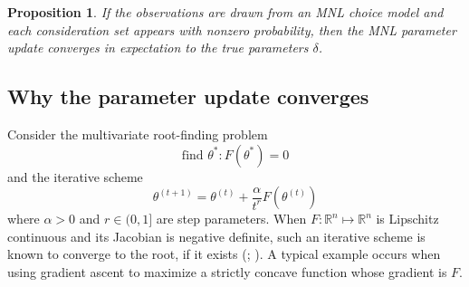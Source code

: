 \documentclass[preprint,12pt,authoryear]{elsarticle}
\newtheorem{proposition}{Proposition}
\begin{document}
\begin{proposition}If the observations are drawn from an MNL choice model and each consideration set appears with nonzero probability, then the MNL parameter update converges in expectation to the true parameters $\delta$.
\end{proposition}


\subsection{Why the parameter update converges}
Consider the multivariate root-finding problem \[\text{find } \theta^*: F(\theta^*) = 0\]
and the iterative scheme \[\theta^{(t+1)} = \theta^{(t)} + \frac{\alpha}{t^r} F\left(\theta^{(t)} \right)\]
where $\alpha >0$ and $r \in (0, 1]$ are step parameters. When $F: \mathbb{R}^n \mapsto \mathbb{R}^n$ is Lipschitz continuous and its Jacobian is negative definite, such an iterative scheme is known to converge to the root, if it exists (\citealp[][thm. 11.6]{nocedal2006}; \citealp[][prop. 1.2.4]{bertsekas1999}). A typical example occurs when using gradient ascent to maximize a strictly concave function whose gradient is $F$.
\end{document}
